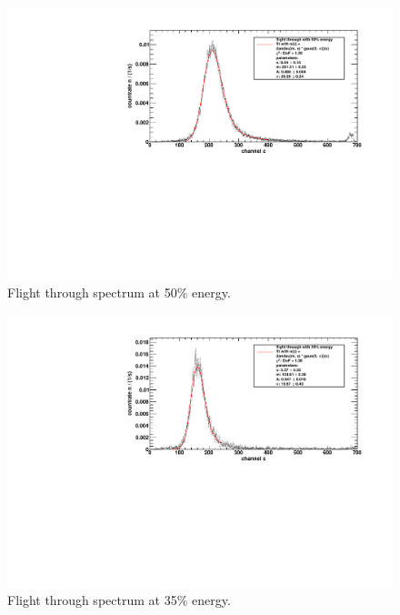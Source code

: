 \begin{figure}[H]
\begin{center}
  \includegraphics[width=\textwidth]{../img/energiekalibration_50.pdf}
  \caption{Flight through spectrum at 50$\%$ energy.}
  \label{img:ecal:50}
\end{center}
\end{figure}

\begin{figure}[H]
\begin{center}
  \includegraphics[width=\textwidth]{../img/energiekalibration_35.pdf}
  \caption{Flight through spectrum at 35$\%$ energy.}
  \label{img:ecal:35}
\end{center}
\end{figure}

